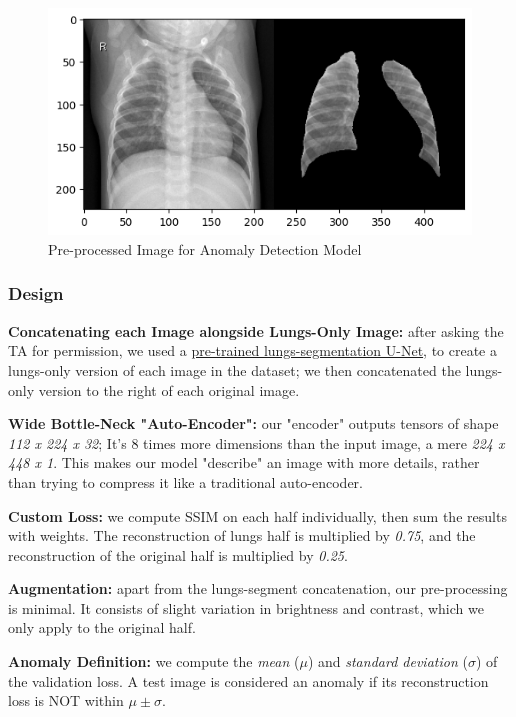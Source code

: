 \documentclass{article}
\begin{document}
\begin{figure}[H]
  \centering
  \includegraphics[width=0.8\linewidth]{concatenated-lungs-segmentation.png}
  \caption{Pre-processed Image for Anomaly Detection Model}
  \label{fig:concatenated-lungs-segmentation}
\end{figure}

\subsubsection{Design}

\textbf{Concatenating each Image alongside Lungs-Only Image:} after asking the TA for permission, we used a \href{https://www.kaggle.com/datasets/farhanhaikhan/unet-lung-segmentation-weights-for-chest-x-rays/data}{pre-trained lungs-segmentation U-Net}, to create a lungs-only version of each image in the dataset; we then concatenated the lungs-only version to the right of each original image.

\textbf{Wide Bottle-Neck "Auto-Encoder":} our "encoder" outputs tensors of shape \textit{112 x 224 x 32}; It's 8 times more dimensions than the input image, a mere \textit{224 x 448 x 1}. This makes our model "describe" an image with more details, rather than trying to compress it like a traditional auto-encoder.

\textbf{Custom Loss:} we compute SSIM on each half individually, then sum the results with weights. The reconstruction of lungs half is multiplied by \textit{0.75}, and the reconstruction of the original half is multiplied by \textit{0.25}.

\textbf{Augmentation:} apart from the lungs-segment concatenation, our pre-processing is minimal. It consists of slight variation in brightness and contrast, which we only apply to the original half.

\textbf{Anomaly Definition:} we compute the \textit{mean} ($\mu$) and \textit{standard deviation} ($\sigma$) of the validation loss. A test image is considered an anomaly if its reconstruction loss is NOT within $\mu\pm\sigma$.
\end{document}
